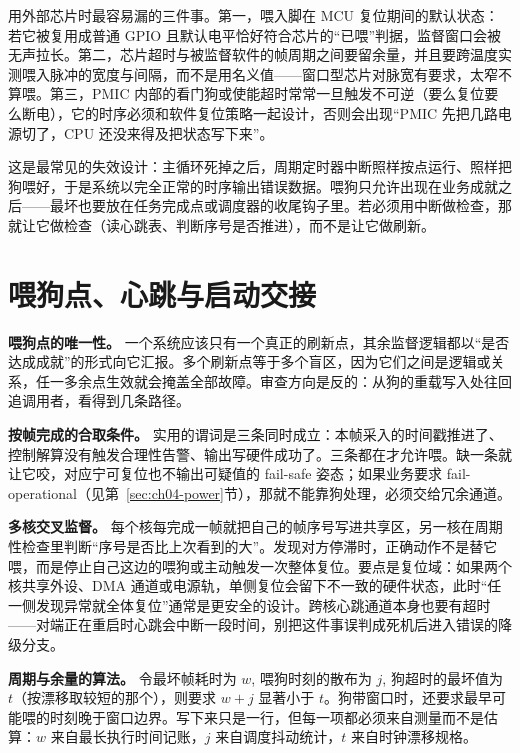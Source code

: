 \documentclass[12pt,a4paper,fontset=fandol]{ctexbook}
\begin{document}
用外部芯片时最容易漏的三件事。第一，喂入脚在 MCU 复位期间的默认状态：若它被复用成普通 GPIO 且默认电平恰好符合芯片的``已喂''判据，监督窗口会被无声拉长。第二，芯片超时与被监督软件的帧周期之间要留余量，并且要跨温度实测喂入脉冲的宽度与间隔，而不是用名义值——窗口型芯片对脉宽有要求，太窄不算喂。第三，PMIC 内部的看门狗或使能超时常常一旦触发不可逆（要么复位要么断电），它的时序必须和软件复位策略一起设计，否则会出现``PMIC 先把几路电源切了，CPU 还没来得及把状态写下来''。

\begin{warning}[title={在 ISR 里喂狗}]
这是最常见的失效设计：主循环死掉之后，周期定时器中断照样按点运行、照样把狗喂好，于是系统以完全正常的时序输出错误数据。喂狗只允许出现在业务成就之后——最坏也要放在任务完成点或调度器的收尾钩子里。若必须用中断做检查，那就让它做检查（读心跳表、判断序号是否推进），而不是让它做刷新。
\end{warning}

\section{喂狗点、心跳与启动交接}
\label{sec:ch04-feed-policy}

\textbf{喂狗点的唯一性。} 一个系统应该只有一个真正的刷新点，其余监督逻辑都以``是否达成成就''的形式向它汇报。多个刷新点等于多个盲区，因为它们之间是逻辑或关系，任一多余点生效就会掩盖全部故障。审查方向是反的：从狗的重载写入处往回追调用者，看得到几条路径。

\textbf{按帧完成的合取条件。} 实用的谓词是三条同时成立：本帧采入的时间戳推进了、控制解算没有触发合理性告警、输出写硬件成功了。三条都在才允许喂。缺一条就让它咬，对应宁可复位也不输出可疑值的 fail-safe 姿态；如果业务要求 fail-operational（见第~\ref{sec:ch04-power}节），那就不能靠狗处理，必须交给冗余通道。

\textbf{多核交叉监督。} 每个核每完成一帧就把自己的帧序号写进共享区，另一核在周期性检查里判断``序号是否比上次看到的大''。发现对方停滞时，正确动作不是替它喂，而是停止自己这边的喂狗或主动触发一次整体复位。要点是复位域：如果两个核共享外设、DMA 通道或电源轨，单侧复位会留下不一致的硬件状态，此时``任一侧发现异常就全体复位''通常是更安全的设计。跨核心跳通道本身也要有超时——对端正在重启时心跳会中断一段时间，别把这件事误判成死机后进入错误的降级分支。

\textbf{周期与余量的算法。} 令最坏帧耗时为 $w$, 喂狗时刻的散布为 $j$, 狗超时的最坏值为 $t$（按漂移取较短的那个），则要求 $w + j$ 显著小于 $t$。狗带窗口时，还要求最早可能喂的时刻晚于窗口边界。写下来只是一行，但每一项都必须来自测量而不是估算：$w$ 来自最长执行时间记账，$j$ 来自调度抖动统计，$t$ 来自时钟漂移规格。
\end{document}

